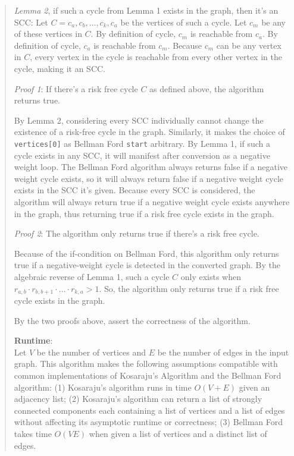 \documentclass[11pt]{article}
\begin{document}
\begin{enumerate}
\begin{quote}
\medskip
\textit{Lemma 2}, if such a cycle from Lemma 1 exists in the graph, then it's an SCC: Let $C = c_a, c_b, \dots, c_k, c_a$ be the vertices of such a cycle. Let $c_m$ be any of these vertices in $C$. By definition of cycle, $c_m$ is reachable from $c_a$. By definition of cycle, $c_a$ is reachable from $c_m$. Because $c_m$ can be any vertex in $C$, every vertex in the cycle is reachable from every other vertex in the cycle, making it an SCC. 

\medskip
\textit{Proof 1}: If there's a risk free cycle $C$ as defined above, the algorithm returns true. 

\medskip
By Lemma 2, considering every SCC individually cannot change the existence of a risk-free cycle in the graph. Similarly, it makes the choice of \texttt{vertices[0]} as Bellman Ford \texttt{start} arbitrary. By Lemma 1, if such a cycle exists in any SCC, it will manifest after conversion as a negative weight loop. The Bellman Ford algorithm always returns false if a negative weight cycle exists, so it will always return false if a negative weight cycle exists in the SCC it's given. Because every SCC is considered, the algorithm will always return true if a negative weight cycle exists anywhere in the graph, thus returning true if a risk free cycle exists in the graph. 

\medskip
\textit{Proof 2}: The algorithm only returns true if there's a risk free cycle. 

\medskip
Because of the if-condition on Bellman Ford, this algorithm only returns true if a negative-weight cycle is detected in the converted graph. By the algebraic reverse of Lemma 1, such a cycle $C$ only exists when $r_{a, b} \cdot r_{b, b + 1} \cdot \dots \cdot r_{k, a} > 1$. So, the algorithm only returns true if a risk free cycle exists in the graph.  

\medskip
By the two proofs above, assert the correctness of the algorithm. 

\medskip
\textbf{Runtime}: \\ 
Let $V$ be the number of vertices and $E$ be the number of edges in the input graph. This algorithm makes the following assumptions compatible with common implementations of Kosaraju's Algorithm and the Bellman Ford algorithm: (1) Kosaraju's algorithm runs in time $O(V + E)$ given an adjacency list; (2) Kosaraju's algorithm can return a list of strongly connected components each containing a list of vertices and a list of edges without affecting its asymptotic runtime or correctness; (3) Bellman Ford takes time $O(VE)$ when given a list of vertices and a distinct list of edges. 


\end{quote}
\end{enumerate}
\end{document}
